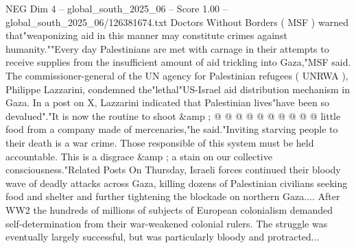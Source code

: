 \begin{textsample}{NEG Dim 4 – global\_south\_2025\_06 – Score 1.00 – global\_south\_2025\_06/126381674.txt}
Doctors Without Borders ( MSF ) warned that"weaponizing aid in this manner may constitute crimes against humanity.""Every day Palestinians are met with carnage in their attempts to receive supplies from the insufficient amount of aid trickling into Gaza,"MSF said.
The commissioner-general of the UN agency for Palestinian refugees ( UNRWA ), Philippe Lazzarini, condemned the"lethal"US-Israel aid distribution mechanism in Gaza.
In a post on X, Lazzarini indicated that Palestinian lives"have been so devalued"."It is now the routine to shoot \&amp ; @ @ @ @ @ @ @ @ @ @ little food from a company made of mercenaries,"he said."Inviting starving people to their death is a war crime.
Those responsible of this system must be held accountable.
This is a disgrace \&amp ; a stain on our collective consciousness."Related Posts On Thursday, Israeli forces continued their bloody wave of deadly attacks across Gaza, killing dozens of Palestinian civilians seeking food and shelter and further tightening the blockade on northern Gaza....
After WW2 the hundreds of millions of subjects of European colonialism demanded self-determination from their war-weakened colonial rulers.
The struggle was eventually largely successful, but was particularly bloody and protracted...

\end{textsample}

